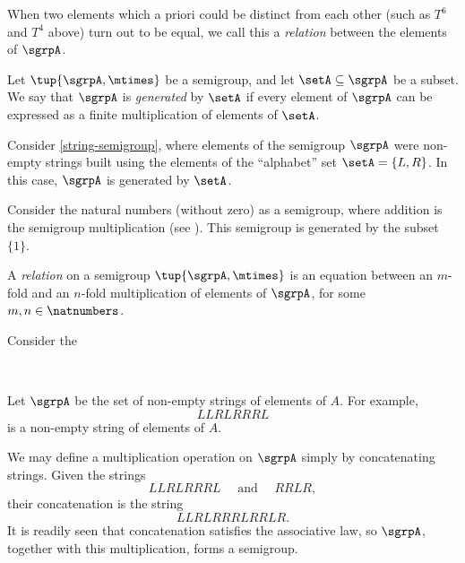When two elements which a priori could be distinct from each other (such as $T^6$ and $T^4$ above) turn out to be equal, we call this a \emph{relation} between the elements of $\sgrpA$.

\begin{definition}
Let $\tup{\sgrpA, \mtimes}$ be a semigroup, and let $\setA \subseteq \sgrpA$ be a subset. We say that $\sgrpA$ is \emph{generated} by $\setA$ if every element of $\sgrpA$ can be expressed as a finite multiplication of elements of $\setA$.
\end{definition}

\begin{example}
Consider \cref{string-semigroup}, where elements of the semigroup $\sgrpA$ were non-empty strings built using the elements of the ``alphabet'' set $\setA = \{ L, R \}$. In this case, $\sgrpA$ is generated by $\setA$.
\end{example}


\begin{example}
Consider the natural numbers (without zero) as a semigroup, where addition is the semigroup multiplication (see \label{natnum-semigroup}). This semigroup is generated by the subset $\{1 \}$.
\end{example}

\begin{definition}
A \emph{relation} on a semigroup $\tup{\sgrpA, \mtimes}$ is an equation between an $m$-fold and an $n$-fold multiplication of elements of $\sgrpA$, for some $m, n \in \natnumbers$.
\end{definition}

\begin{example}
Consider the
\end{example}


\


Let $\sgrpA$ be the set of non-empty strings of elements of $A$. For example,
$$ LLRLRRRL $$
is a non-empty string of elements of $A$.

We may define a multiplication operation on $\sgrpA$ simply by concatenating strings. Given the strings
$$ LLRLRRRL  \quad \text{ and } \quad RRLR, $$
their concatenation is the string
$$ LLRLRRRLRRLR.$$
It is readily seen that concatenation satisfies the associative law, so $\sgrpA$, together with this multiplication, forms a semigroup.
